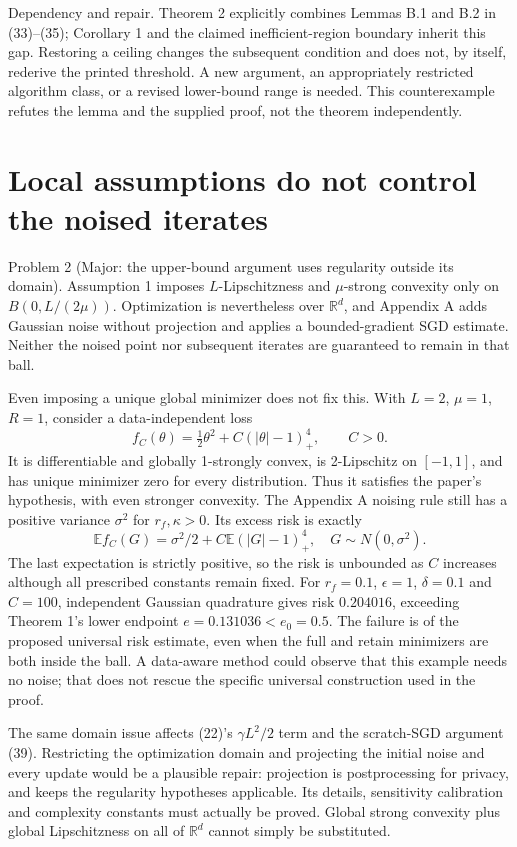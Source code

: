 \documentclass[10pt]{article}
\begin{document}
Dependency and repair. Theorem 2 explicitly combines Lemmas B.1 and B.2 in (33)–(35); Corollary 1 and the claimed inefficient-region boundary inherit this gap. Restoring a ceiling changes the subsequent condition and does not, by itself, rederive the printed threshold. A new argument, an appropriately restricted algorithm class, or a revised lower-bound range is needed. This counterexample refutes the lemma and the supplied proof, not the theorem independently.\par
\section*{Local assumptions do not control the noised iterates}
Problem 2 (Major: the upper-bound argument uses regularity outside its domain).  Assumption 1 imposes \(L\)-Lipschitzness and \(\mu\)-strong convexity only on \(B(0,L/(2\mu))\). Optimization is nevertheless over \(\mathbb R^d\), and Appendix A adds Gaussian noise without projection and applies a bounded-gradient SGD estimate. Neither the noised point nor subsequent iterates are guaranteed to remain in that ball.\par
Even imposing a unique global minimizer does not fix this. With \(L=2\), \(\mu=1\), \(R=1\), consider a data-independent loss \[f_C(\theta)=\tfrac12\theta^2+C(|\theta|-1)_+^4,\qquad C>0.\] It is differentiable and globally 1-strongly convex, is 2-Lipschitz on \([-1,1]\), and has unique minimizer zero for every distribution. Thus it satisfies the paper’s hypothesis, with even stronger convexity. The Appendix A noising rule still has a positive variance \(\sigma^2\) for \(r_f,\kappa>0\). Its excess risk is exactly \[\mathbb E f_C(G)=\sigma^2/2+C\mathbb E(|G|-1)_+^4,\quad G\sim N(0,\sigma^2).\] The last expectation is strictly positive, so the risk is unbounded as \(C\) increases although all prescribed constants remain fixed. For \(r_f=0.1\), \(\epsilon=1\), \(\delta=0.1\) and \(C=100\), independent Gaussian quadrature gives risk \(0.204016\), exceeding Theorem 1’s lower endpoint \(e=0.131036<e_0=0.5\). The failure is of the proposed universal risk estimate, even when the full and retain minimizers are both inside the ball. A data-aware method could observe that this example needs no noise; that does not rescue the specific universal construction used in the proof.\par
The same domain issue affects (22)’s \(\gamma L^2/2\) term and the scratch-SGD argument (39). Restricting the optimization domain and projecting the initial noise and every update would be a plausible repair: projection is postprocessing for privacy, and keeps the regularity hypotheses applicable. Its details, sensitivity calibration and complexity constants must actually be proved. Global strong convexity plus global Lipschitzness on all of \(\mathbb R^d\) cannot simply be substituted.\par
\end{document}
